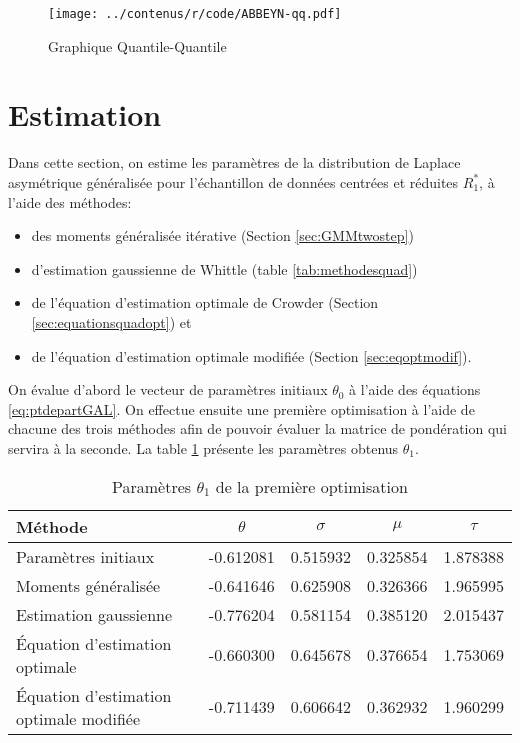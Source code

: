 \begin{figure}[!ht]
  \centering
  \texttt{[image: ../contenus/r/code/ABBEYN-qq.pdf]}
  \caption{Graphique Quantile-Quantile}
  \label{fig:qqplotR1}
\end{figure}

\section{Estimation}
\label{sec:estimation}

Dans cette section, on estime les paramètres de la distribution de
Laplace asymétrique généralisée pour l'échantillon de données centrées
et réduites $R_1^{*}$, à l'aide des méthodes:
\begin{itemize}
\item des moments généralisée itérative (Section \ref{sec:GMMtwostep})
\item d'estimation gaussienne de Whittle (table
  \ref{tab:methodesquad})
\item de l'équation d'estimation optimale de Crowder (Section
  \ref{sec:equationsquadopt}) et
\item de l'équation d'estimation optimale modifiée (Section
  \ref{sec:eqoptmodif}).
\end{itemize}

On évalue d'abord le vecteur de paramètres initiaux $\theta_0$ à
l'aide des équations \eqref{eq:ptdepartGAL}. On effectue ensuite une
première optimisation à l'aide de chacune des trois méthodes afin de
pouvoir évaluer la matrice de pondération qui servira à la seconde. La
table \ref{tab:premiereoptimR1} présente les paramètres obtenus
$\theta_1$.

\begin{table}[!ht]
  \centering
  \begin{tabular}{lcccc}
    \hline
    \textbf{Méthode} & $\theta$ & $\sigma$ & $\mu$ & $\tau$ \\
    \hline
    Paramètres initiaux & -0.612081 & 0.515932 & 0.325854 & 1.878388 \\
    \hline
    Moments généralisée & -0.641646 & 0.625908 & 0.326366 & 1.965995 \\
    Estimation gaussienne & -0.776204 & 0.581154 & 0.385120 & 2.015437 \\
    Équation d'estimation optimale & -0.660300 & 0.645678 & 0.376654 & 1.753069 \\
    Équation d'estimation optimale modifiée & -0.711439 & 0.606642 & 0.362932 & 1.960299 \\
    \hline
  \end{tabular}
  \caption{Paramètres $\theta_1$ de la première optimisation}
  \label{tab:premiereoptimR1}
\end{table}

